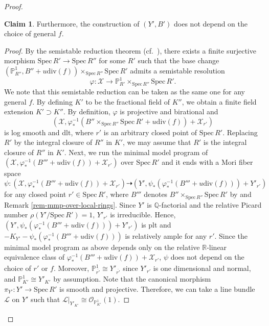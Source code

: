 \documentclass[12pt,twoside]{amsart}
\theoremstyle{definition}
\newtheorem*{claim*}{Claim}
\begin{document}
\begin{proof}
\begin{claim*}
Furthermore, the construction of $(Y',B')$ does not depend on the choice of general $f$. 
\end{claim*}
\begin{proof}[Proof]
    By the semistable reduction theorem (cf.~\cite{KKMS}), there exists a finite surjective morphism $\mathrm{Spec}\,R' \to \mathrm{Spec}\,R''$ for some $R'$ such that the base change $(\mathbb{P}^1_{R''},B''+u\mathrm{div}(f))\times_{\mathrm{Spec}\,R''}\mathrm{Spec}\,R'$ admits a semistable resolution 
    $$\varphi\colon\mathcal{X}\to\mathbb{P}^1_{R'}\times_{\mathrm{Spec}\,R''}\mathrm{Spec}\,R'.$$ 
    We note that this semistable reduction can be taken as the same one for any general $f$.
    By defining $K'$ to be the fractional field of $K''$, we obtain a finite field extension $K' \supset K''$. 
    By definition, $\varphi$ is projective and birational and 
    \[
    (\mathcal{X},\varphi^{-1}_*(B''\times_{\mathrm{Spec}\,R''}\mathrm{Spec}\,R'+u\mathrm{div}(f))+\mathcal{X}_{r'})
    \] 
    is log smooth and dlt, where $r'$ is an arbitrary closed point of $\mathrm{Spec}\,R'$. 
    Replacing $R'$ by the integral closure of $R''$ in $K'$, we may assume that $R'$ is the integral closure of $R''$ in $K'$. 
    Next, 
    we run the minimal model program of $(\mathcal{X},\varphi^{-1}_*(B'''+u\mathrm{div}(f))+\mathcal{X}_{r'})$ over $\mathrm{Spec}\,R'$ and it ends with a Mori fiber space $$\psi\colon(\mathcal{X},\varphi^{-1}_*(B'''+u\mathrm{div}(f))+\mathcal{X}_{r'})\dashrightarrow (Y',\psi_*(\varphi^{-1}_*(B'''+u\mathrm{div}(f)))+Y'_{r'})$$
   for any closed point $r'\in\mathrm{Spec}\,R'$, where $B'''$ denotes $B''\times_{\mathrm{Spec}\,R''}\mathrm{Spec}\,R'$ by \cite{BCHM} and Remark \ref{rem-mmp-over-local-rings}.
    Since $Y'$ is $\mathbb{Q}$-factorial and the relative Picard number $\rho(Y'/\mathrm{Spec}\,R')=1$, $Y'_{r'}$ is irreducible.
    Hence, $(Y',\psi_*(\varphi^{-1}_*(B'''+u\mathrm{div}(f)))+Y'_{r'})$ is plt and $-K_{Y'}-\psi_*(\varphi^{-1}_*(B'''+u\mathrm{div}(f)))$ is relatively ample for any $r'$.
    Since the minimal model program as above depends only on the relative $\mathbb{R}$-linear equivalence class of $\varphi^{-1}_*(B'''+u\mathrm{div}(f))+\mathcal{X}_{r'}$, $\psi$ does not depend on the choice of $r'$ or $f$.
    Moreover, $\mathbb{P}^1_{\overline{r'}}\cong Y'_{\overline{r'}}$ since $Y'_{r'}$ is one dimensional and normal, and $\mathbb{P}^1_{K'}\cong Y'_{K'}$ by assumption.
Note that the canonical morphism $\pi_{Y'}\colon Y'\to\mathrm{Spec}\,R'$ is smooth and projective.
    Therefore, we can take a line bundle $\mathcal{L}$ on $Y'$ such that $\mathcal{L}|_{Y'_{K'}}\cong\mathcal{O}_{\mathbb{P}^1_{K'}}(1)$. 

\end{proof}
\end{proof}
\end{document}
